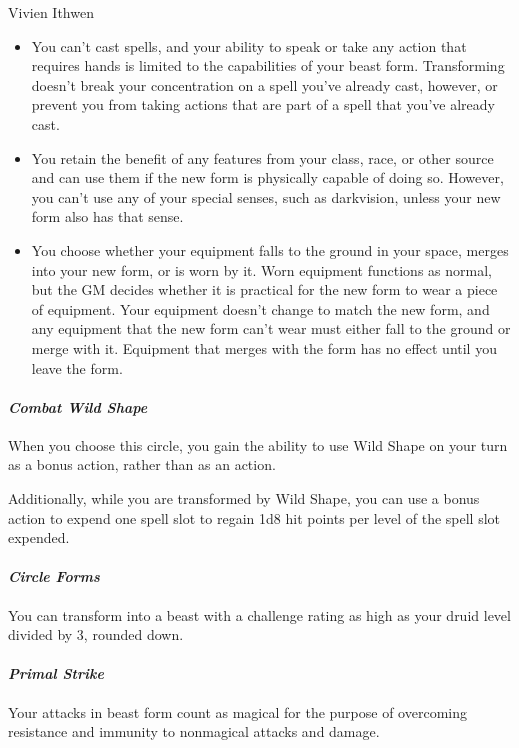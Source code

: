 \documentclass[10pt,twoside,twocolumn]{book}
\begin{document}
\begin{rpg-monsterbox}{Vivien Ithwen}
\begin{itemize}
       \item You can't cast spells, and your ability to speak or take any action that requires hands is limited to the capabilities of your beast form.
       Transforming doesn't break your concentration on a spell you've already cast, however, or prevent you from taking actions that are part of a spell that you've already cast.

       \item You retain the benefit of any features from your class, race, or other source and can use them if the new form is physically capable of doing so.
       However, you can't use any of your special senses, such as darkvision, unless your new form also has that sense.

      \item You choose whether your equipment falls to the ground in your space, merges into your new form, or is worn by it.
      Worn equipment functions as normal, but the GM decides whether it is practical for the new form to wear a piece of equipment.
      Your equipment doesn't change to match the new form, and any equipment that the new form can't wear must either fall to the ground or merge with it.
      Equipment that merges with the form has no effect until you leave the form.
   \end{itemize}

   \paragraph{\emph{Combat Wild Shape}}
   When you choose this circle, you gain the ability to use Wild Shape on your turn as a bonus action, rather than as an action.

   \hskip4mm Additionally, while you are transformed by Wild Shape, you can use a bonus action to expend one spell slot to regain 1d8 hit points per level of the spell slot expended.

   \paragraph{\emph{Circle Forms}}
   You can transform into a beast with a challenge rating as high as your druid level divided by 3, rounded down.

   \paragraph{\emph{Primal Strike}}
   Your attacks in beast form count as magical for the purpose of overcoming resistance and immunity to nonmagical attacks and damage.


\end{rpg-monsterbox}
\end{document}
